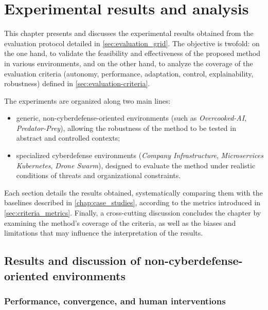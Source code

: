 \clearpage
\thispagestyle{empty}
\null
\newpage



\chapter{Experimental results and analysis}

This chapter presents and discusses the experimental results obtained from the evaluation protocol detailed in \autoref{sec:evaluation_grid}.
The objective is twofold: on the one hand, to validate the feasibility and effectiveness of the proposed method in various environments, and on the other hand, to analyze the coverage of the evaluation criteria (autonomy, performance, adaptation, control, explainability, robustness) defined in \autoref{sec:evaluation-criteria}.

The experiments are organized along two main lines:
\begin{itemize}
  \item generic, non-cyberdefense-oriented environments (such as \textit{Overcooked-AI}, \textit{Predator-Prey}), allowing the robustness of the method to be tested in abstract and controlled contexts;
  \item specialized cyberdefense environments (\textit{Company Infrastructure}, \textit{Microservices Kubernetes}, \textit{Drone Swarm}), designed to evaluate the method under realistic conditions of threats and organizational constraints.
\end{itemize}

Each section details the results obtained, systematically comparing them with the baselines described in \autoref{chap:case_studies}, according to the metrics introduced in \autoref{sec:criteria_metrics}.
Finally, a cross-cutting discussion concludes the chapter by examining the method's coverage of the criteria, as well as the biases and limitations that may influence the interpretation of the results.

\section{Results and discussion of non-cyberdefense-oriented environments}\label{sec:results_and_discussion_cyberdefense}

\subsection*{Performance, convergence, and human interventions}

